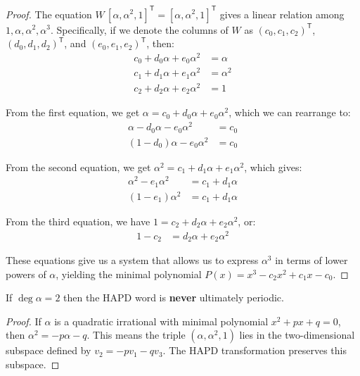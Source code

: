 \begin{theorem}
\begin{proof}
The equation $W\,[\alpha,\alpha^{2},1]^{\mathsf{T}}=[\alpha,\alpha^{2},1]^{\mathsf{T}}$ gives a linear relation among $1,\alpha,\alpha^{2},\alpha^{3}$. Specifically, if we denote the columns of $W$ as $(c_0, c_1, c_2)^{\mathsf{T}}$, $(d_0, d_1, d_2)^{\mathsf{T}}$, and $(e_0, e_1, e_2)^{\mathsf{T}}$, then:
\begin{align}
c_0 + d_0\alpha + e_0\alpha^2 &= \alpha\\
c_1 + d_1\alpha + e_1\alpha^2 &= \alpha^2\\
c_2 + d_2\alpha + e_2\alpha^2 &= 1
\end{align}

From the first equation, we get $\alpha = c_0 + d_0\alpha + e_0\alpha^2$, which we can rearrange to:
\begin{align}
\alpha - d_0\alpha - e_0\alpha^2 &= c_0\\
(1 - d_0)\alpha - e_0\alpha^2 &= c_0
\end{align}

From the second equation, we get $\alpha^2 = c_1 + d_1\alpha + e_1\alpha^2$, which gives:
\begin{align}
\alpha^2 - e_1\alpha^2 &= c_1 + d_1\alpha\\
(1 - e_1)\alpha^2 &= c_1 + d_1\alpha
\end{align}

From the third equation, we have $1 = c_2 + d_2\alpha + e_2\alpha^2$, or:
\begin{align}
1 - c_2 &= d_2\alpha + e_2\alpha^2
\end{align}

These equations give us a system that allows us to express $\alpha^3$ in terms of lower powers of $\alpha$, yielding the minimal polynomial $P(x)=x^{3}-c_{2}x^{2}+c_{1}x-c_{0}$.
\end{proof}

\begin{lemma}\label{lem:exclusion_quadratic}
If $\deg\alpha=2$ then the HAPD word is \textbf{never} ultimately periodic.
\end{lemma}

\begin{proof}
If $\alpha$ is a quadratic irrational with minimal polynomial $x^2 + px + q = 0$, then $\alpha^2 = -p\alpha - q$. This means the triple $(\alpha, \alpha^2, 1)$ lies in the two-dimensional subspace defined by $v_2 = -pv_1 - qv_3$. The HAPD transformation preserves this subspace.


\end{proof}
\end{theorem}
